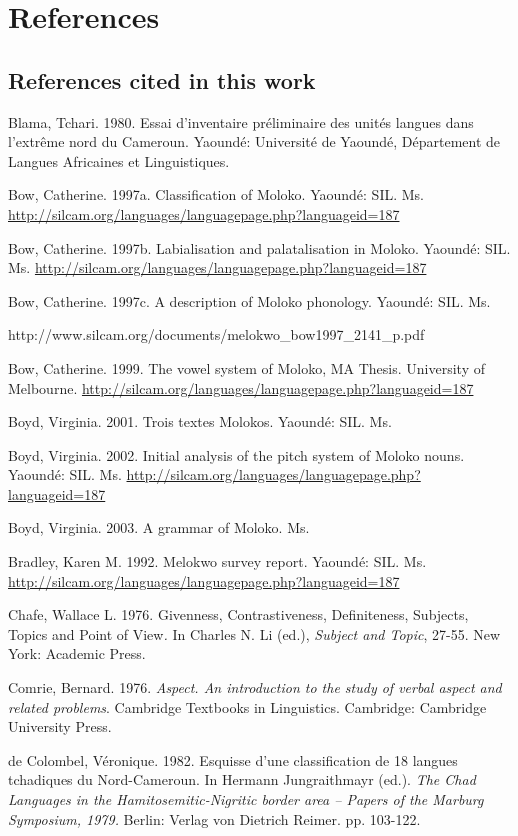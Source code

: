 \chapter[References]{References}
\hypertarget{RefHeading1213601525720847}{}\section{References cited in this work}
\hypertarget{RefHeading1213621525720847}{}
Blama, Tchari.  1980.  Essai d’inventaire préliminaire des unités langues dans l’extrême nord du Cameroun. Yaoundé:  Université de Yaoundé, Département de Langues Africaines et Linguistiques.  

Bow, Catherine.  1997a.  Classification of Moloko.  Yaoundé:  SIL. Ms. \url{http://silcam.org/languages/languagepage.php?languageid=187} 

Bow, Catherine. 1997b. Labialisation and palatalisation in Moloko. Yaoundé: SIL. Ms. \url{http://silcam.org/languages/languagepage.php?languageid=187}

Bow, Catherine. 1997c.  A description of Moloko phonology.  Yaoundé:  SIL. Ms.

http://www.silcam.org/documents/melokwo\_bow1997\_2141\_p.pdf

Bow, Catherine.  1999.  The vowel system of Moloko, MA Thesis.  University of Melbourne. \url{http://silcam.org/languages/languagepage.php?languageid=187}  

Boyd, Virginia.  2001.  Trois textes Molokos. Yaoundé:  SIL. Ms.

Boyd, Virginia.  2002.  Initial analysis of the pitch system of Moloko nouns.  Yaoundé:  SIL. Ms. \url{http://silcam.org/languages/languagepage.php?languageid=187}

Boyd, Virginia.  2003.  A grammar of Moloko. Ms.

Bradley, Karen M. 1992.  Melokwo survey report.  Yaoundé:  SIL. Ms. \url{http://silcam.org/languages/languagepage.php?languageid=187}

Chafe, Wallace L. 1976. Givenness, Contrastiveness, Definiteness, Subjects, Topics and Point of View\textit{. }In Charles N. Li (ed.), \textit{Subject and Topic}, 27-55. New York: Academic Press. 

Comrie, Bernard. 1976. \textit{Aspect. An introduction to the study of verbal aspect and related problems}. Cambridge Textbooks in Linguistics. Cambridge: Cambridge University Press. 

de Colombel, Véronique.  1982.  Esquisse d’une classification de 18 langues tchadiques du Nord-Cameroun.  In Hermann Jungraithmayr (ed.). \textit{The Chad Languages in the Hamitosemitic-Nigritic border area – Papers of the Marburg Symposium, 1979.}  Berlin:  Verlag von Dietrich Reimer.  pp. 103-122. 

